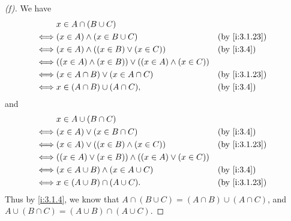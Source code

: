 \begin{proof}[(f)]
  We have
  \begin{align*}
         & x \in A \cap (B \cup C)                                                         \\
    \iff & (x \in A) \land (x \in B \cup C)                             &  & \by{i:3.1.23} \\
    \iff & (x \in A) \land ((x \in B) \lor (x \in C))                   &  & \by{i:3.4}    \\
    \iff & ((x \in A) \land (x \in B)) \lor ((x \in A) \land (x \in C))                    \\
    \iff & (x \in A \cap B) \lor (x \in A \cap C)                       &  & \by{i:3.1.23} \\
    \iff & x \in (A \cap B) \cup (A \cap C),                            &  & \by{i:3.4}
  \end{align*}
  and
  \begin{align*}
         & x \in A \cup (B \cap C)                                                        \\
    \iff & (x \in A) \lor (x \in B \cap C)                             &  & \by{i:3.4}    \\
    \iff & (x \in A) \lor ((x \in B) \land (x \in C))                  &  & \by{i:3.1.23} \\
    \iff & ((x \in A) \lor (x \in B)) \land ((x \in A) \lor (x \in C))                    \\
    \iff & (x \in A \cup B) \land (x \in A \cup C)                     &  & \by{i:3.4}    \\
    \iff & x \in (A \cup B) \cap (A \cup C).                           &  & \by{i:3.1.23}
  \end{align*}
  Thus by \cref{i:3.1.4}, we know that \(A \cap (B \cup C) = (A \cap B) \cup (A \cap C)\), and \(A \cup (B \cap C) = (A \cup B) \cap (A \cup C)\).
\end{proof}

